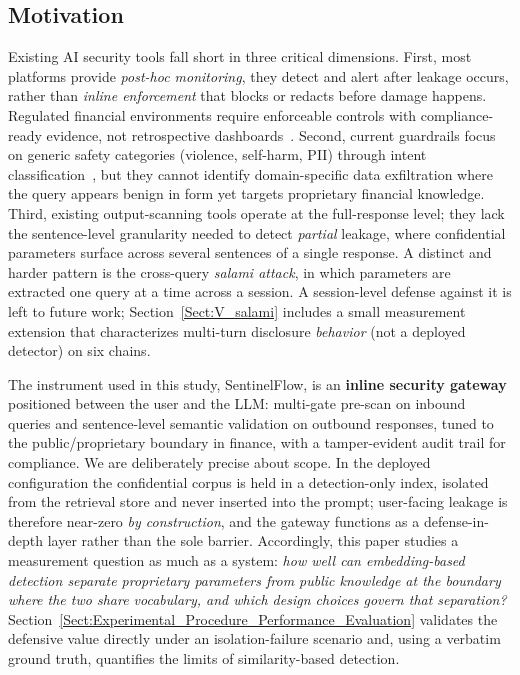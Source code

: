 \documentclass[journal]{IEEEtran}
\begin{document}
\subsection{Motivation}

Existing AI security tools fall short in three critical dimensions. First, most platforms provide \textit{post-hoc monitoring}, they detect and alert after leakage occurs, rather than \textit{inline enforcement} that blocks or redacts before damage happens. Regulated financial environments require enforceable controls with compliance-ready evidence, not retrospective dashboards~\cite{nist_ai_rmf, nist_ai_600_1}. Second, current guardrails focus on generic safety categories (violence, self-harm, PII) through intent classification~\cite{llama_guard, ms_prompt_shields}, but they cannot identify domain-specific data exfiltration where the query appears benign in form yet targets proprietary financial knowledge. Third, existing output-scanning tools operate at the full-response level; they lack the sentence-level granularity needed to detect \textit{partial} leakage, where confidential parameters surface across several sentences of a single response. A distinct and harder pattern is the cross-query \textit{salami attack}, in which parameters are extracted one query at a time across a session. A session-level defense against it is left to future work; Section~\ref{Sect:V_salami} includes a small measurement extension that characterizes multi-turn disclosure \emph{behavior} (not a deployed detector) on six chains.

The instrument used in this study, SentinelFlow, is an \textbf{inline security gateway} positioned between the user and the LLM: multi-gate pre-scan on inbound queries and sentence-level semantic validation on outbound responses, tuned to the public/proprietary boundary in finance, with a tamper-evident audit trail for compliance. We are deliberately precise about scope. In the deployed configuration the confidential corpus is held in a detection-only index, isolated from the retrieval store and never inserted into the prompt; user-facing leakage is therefore near-zero \textit{by construction}, and the gateway functions as a defense-in-depth layer rather than the sole barrier. Accordingly, this paper studies a measurement question as much as a system: \textit{how well can embedding-based detection separate proprietary parameters from public knowledge at the boundary where the two share vocabulary, and which design choices govern that separation?} Section~\ref{Sect:Experimental_Procedure_Performance_Evaluation} validates the defensive value directly under an isolation-failure scenario and, using a verbatim ground truth, quantifies the limits of similarity-based detection.
\end{document}

